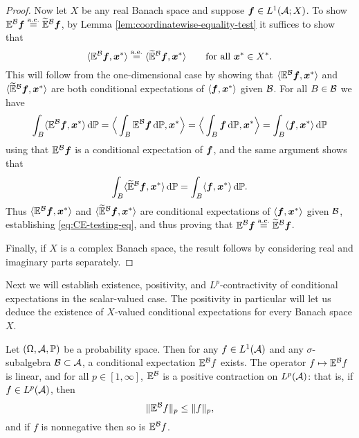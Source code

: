 \begin{proof}
  Now let $X$ be any real Banach space and suppose $\bm{f} \in L^1(\mathcal{A};X)$.
  To show $\mathbb{E}^{\mathcal{B}} \bm{f} \stackrel{\mathrm{a.e.}}{=} \widetilde{\mathbb{E}}^{\mathcal{B}} \bm{f}$, by Lemma \ref{lem:coordinatewise-equality-test} it suffices to show that
  \begin{equation}\label{eq:CE-testing-eq}
    \langle \mathbb{E}^{\mathcal{B}} \bm{f}, \bm{x}^* \rangle \stackrel{\mathrm{a.e.}}{=} \langle \widetilde{\mathbb{E}}^{\mathcal{B}} \bm{f}, \bm{x}^* \rangle \qquad \text{for all $\bm{x}^* \in X^*$.}
  \end{equation}
  This will follow from the one-dimensional case by showing that $\langle \mathbb{E}^{\mathcal{B}} \bm{f}, \bm{x}^* \rangle$ and $\langle \widetilde{\mathbb{E}}^{\mathcal{B}} \bm{f}, \bm{x}^* \rangle$ are both conditional expectations of $\langle \bm{f}, \bm{x}^* \rangle$ given $\mathcal{B}$.
  For all $B \in \mathcal{B}$ we have
  \begin{equation*}
    \int_B \langle \mathbb{E}^{\mathcal{B}} \bm{f}, \bm{x}^* \rangle \, \mathrm{d}\mathbb{P}
    = \Big\langle \int_B \mathbb{E}^{\mathcal{B}} \bm{f} \, \mathrm{d}\mathbb{P}, \bm{x}^* \Big\rangle
    = \Big\langle \int_B \bm{f} \, \mathrm{d}\mathbb{P}, \bm{x}^* \Big\rangle
    = \int_B \langle \bm{f}, \bm{x}^* \rangle \, \mathrm{d}\mathbb{P}
  \end{equation*}
  using that $\mathbb{E}^{\mathcal{B}}\bm{f}$ is a conditional expectation of $\bm{f}$, and the same argument shows that
  \begin{equation*}
    \int_B \langle \widetilde{\mathbb{E}}^{\mathcal{B}} \bm{f}, \bm{x}^* \rangle \, \mathrm{d}\mathbb{P} = \int_B \langle \bm{f}, \bm{x}^* \rangle \, \mathrm{d}\mathbb{P}.
  \end{equation*}
  Thus $\langle \mathbb{E}^{\mathcal{B}} \bm{f}, \bm{x}^* \rangle$ and $\langle \widetilde{\mathbb{E}}^{\mathcal{B}} \bm{f}, \bm{x}^* \rangle$ are conditional expectations of $\langle \bm{f}, \bm{x}^* \rangle$ given $\mathcal{B}$, establishing \eqref{eq:CE-testing-eq}, and thus proving that $\mathbb{E}^{\mathcal{B}} \bm{f} \stackrel{\mathrm{a.e.}}{=} \widetilde{\mathbb{E}}^{\mathcal{B}} \bm{f}$.

  Finally, if $X$ is a complex Banach space, the result follows by considering real and imaginary parts separately.
\end{proof}

Next we will establish existence, positivity, and $L^p$-contractivity of conditional expectations in the scalar-valued case.
The positivity in particular will let us deduce the existence of $X$-valued conditional expectations for every Banach space $X$.

\begin{thm}\label{thm:conditional-expectation-existence-scalar}
  Let $(\Omega,\mathcal{A},\mathbb{P})$ be a probability space.
  Then for any $f \in L^1(\mathcal{A})$ and any $\sigma$-subalgebra $\mathcal{B} \subset \mathcal{A}$, a conditional expectation $\mathbb{E}^{\mathcal{B}}f$ exists.
  The operator $f \mapsto \mathbb{E}^{\mathcal{B}}f$ is linear, and for all $p \in [1,\infty]$, $\mathbb{E}^{\mathcal{B}}$ is a positive contraction on $L^p(\mathcal{A})$: that is, if $f \in L^p(\mathcal{A})$, then
  \begin{equation*}
    \|\mathbb{E}^{\mathcal{B}}f\|_{p} \leq \|f\|_{p},
  \end{equation*}
  and if $f$ is nonnegative then so is $\mathbb{E}^{\mathcal{B}}f$.
\end{thm}

